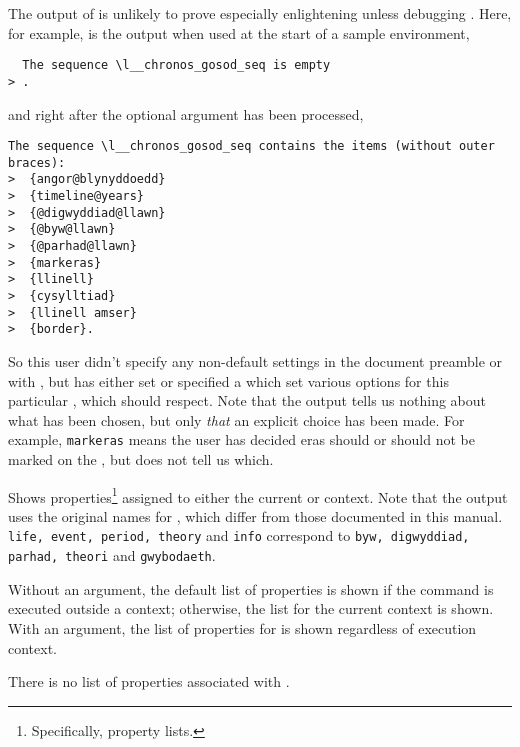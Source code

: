 \documentclass[10pt,british,a4paper]{ltxdoc}
\newcommand*\pkg[1]{\textpkg{#1}}
\begin{document}
The output of  is unlikely to prove especially enlightening unless debugging \pkg{chronos}.
Here, for example, is the output when used at the start of a sample  environment, 
\begin{verbatim}
  The sequence \l__chronos_gosod_seq is empty
> .
\end{verbatim}
and right after the optional argument has been processed,
\begin{verbatim}
The sequence \l__chronos_gosod_seq contains the items (without outer braces):
>  {angor@blynyddoedd}
>  {timeline@years}
>  {@digwyddiad@llawn}
>  {@byw@llawn}
>  {@parhad@llawn}
>  {markeras}
>  {llinell}
>  {cysylltiad}
>  {llinell amser}
>  {border}.
\end{verbatim}
So this user didn't specify any non-default settings in the document preamble or with , but has either set or specified a \chronosstylelabelname{} which set various options for this particular  \envlabelname{}, which \pkg{chronos} should respect.
Note that the output tells us nothing about {what} has been chosen, but only \emph{that} an explicit choice has been made.
For example, \texttt{markeras} means the user has decided eras should or should not be marked on the , but does not tell us which.

\DescribeMacro{\chronosshowfeatures}\AfterLastParam %
Shows properties\footnote{Specifically, \pkg{expl3} property lists.} assigned to either the current or  context.
Note that the output uses the original names for \tagslabelname{}, which differ from those documented in this manual.
\texttt{life, event, period, theory} and \texttt{info} correspond to \texttt{byw, digwyddiad, parhad, theori} and \texttt{gwybodaeth}.

Without an argument, the default list of properties is shown if the command is executed outside a  context; otherwise, the list for the current context is shown.
With an argument, the list of properties for  is shown regardless of execution context.

There is no list of properties associated with \taglabelname{} .
\end{document}
